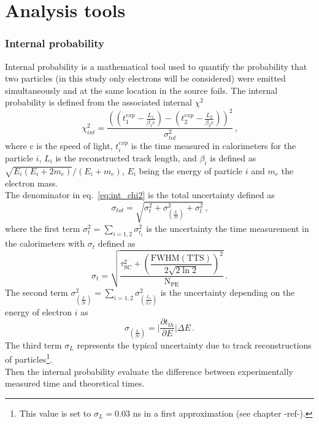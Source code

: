 \chapter{Analysis tools}


\subsection{Internal probability}
\label{subsec:internal_prob}
Internal probability is a mathematical tool used to quantify the probability that two particles (in this study only electrons will be considered) were emitted simultaneously and at the same location in the source foils.
The internal probability is defined from the associated internal $\chi^{2}$
\begin{equation}
  \chi^{2}_{int}=\frac{((t^{exp}_{1} - \frac{L_{1}}{\beta_{1} c}) - (t^{exp}_{2} - \frac{L_{2}}{\beta_{2} c}))^{2}}{\sigma_{tot}^{2}}\,\text{,}
  \label{eq:int_chi2}
\end{equation}
where c is the speed of light, $t^{exp}_{i}$ is the time measured in calorimeters for the particle $i$, $L_{i}$ is the reconstructed track length, and $\beta_{i}$ is defined as $\sqrt{E_{i}(E_{i} + 2m_{e})} / (E_{i} + m_{e})$, $E_{i}$ being the energy of particle $i$ and $m_{e}$ the electron mass.\\
The denominator in eq.~\ref{eq:int_chi2} is the total uncertainty defined as
\begin{equation}
  \sigma_{tot}=\sqrt{\sigma_{t}^{2}+\sigma_{\left(\frac{L}{\beta c}\right)}^{2}+\sigma_{l}^{2}}\,\text{,}
  \label{eq:sigma_tot}
\end{equation}
where the first term $\sigma^{2}_{t}=\sum_{i=1,2}\sigma^{2}_{t_{i}}$ is the uncertainty the time measurement in the calorimeters with $\sigma_{t}$ defined as
\begin{equation}
  \sigma_{t}=\sqrt{\dfrac{\tau_{\text{SC}}^{2}+\left(\dfrac{\text{FWHM}(\text{TTS})}{2\sqrt{2\ln{2}}}\right)^{2}}{\text{N}_\text{PE}}}\,\text{.}
  \label{eq:sigma_t}
\end{equation}
The second term $\sigma^{2}_{\left(\frac{L}{\beta c}\right)}=\sum_{i=1,2}\sigma^{2}_{\left(\frac{L_{i}}{\beta_{i}c}\right)}$ is the uncertainty depending on the energy of electron $i$ as
\begin{equation}
\sigma_{\left(\frac{L}{\beta c}\right)} = \biggl\lvert \dfrac{\partial t_{th}}{\partial E}  \biggr\rvert \Delta E\,\text{.}
  \label{eq:sigma_L}
\end{equation}
The third term $\sigma_{L}$ represents the typical uncertainty due to track reconstructions of particles\footnote{This value is set to $\sigma_{L}=0.03$ ns in a first approximation (see chapter -ref-).}.\\
Then the internal probability evaluate the difference between experimentally measured time and theoretical times.





